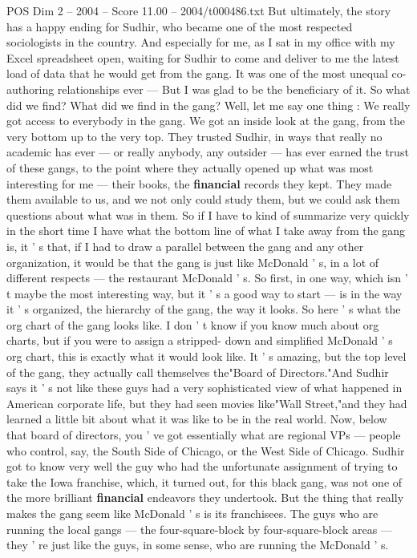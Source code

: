 \begin{textsample}{POS Dim 2 – 2004 – Score 11.00 – 2004/t000486.txt}
But ultimately, the story has a happy ending for Sudhir, who became one of the most respected sociologists in the country.
And especially for me, as I sat in my office with my Excel spreadsheet open, waiting for Sudhir to come and deliver to me the latest load of data that he would get from the gang.
It was one of the most unequal co-authoring relationships ever — But I was glad to be the beneficiary of it.
So what did we find?
What did we find in the gang?
Well, let me say one thing : We really got access to everybody in the gang.
We got an inside look at the gang, from the very bottom up to the very top.
They trusted Sudhir, in ways that really no academic has ever — or really anybody, any outsider — has ever earned the trust of these gangs, to the point where they actually opened up what was most interesting for me — their books, the \textbf{financial} records they kept.
They made them available to us, and we not only could study them, but we could ask them questions about what was in them.
So if I have to kind of summarize very quickly in the short time I have what the bottom line of what I take away from the gang is, it ' s that, if I had to draw a parallel between the gang and any other organization, it would be that the gang is just like McDonald ' s, in a lot of different respects — the restaurant McDonald ' s.
So first, in one way, which isn ' t maybe the most interesting way, but it ' s a good way to start — is in the way it ' s organized, the hierarchy of the gang, the way it looks.
So here ' s what the org chart of the gang looks like.
I don ' t know if you know much about org charts, but if you were to assign a stripped- down and simplified McDonald ' s org chart, this is exactly what it would look like.
It ' s amazing, but the top level of the gang, they actually call themselves the"Board of Directors."And Sudhir says it ' s not like these guys had a very sophisticated view of what happened in American corporate life, but they had seen movies like"Wall Street,"and they had learned a little bit about what it was like to be in the real world.
Now, below that board of directors, you ' ve got essentially what are regional VPs — people who control, say, the South Side of Chicago, or the West Side of Chicago.
Sudhir got to know very well the guy who had the unfortunate assignment of trying to take the Iowa franchise, which, it turned out, for this black gang, was not one of the more brilliant \textbf{financial} endeavors they undertook.
But the thing that really makes the gang seem like McDonald ' s is its franchisees.
The guys who are running the local gangs — the four-square-block by four-square-block areas — they ' re just like the guys, in some sense, who are running the McDonald ' s.

\end{textsample}
